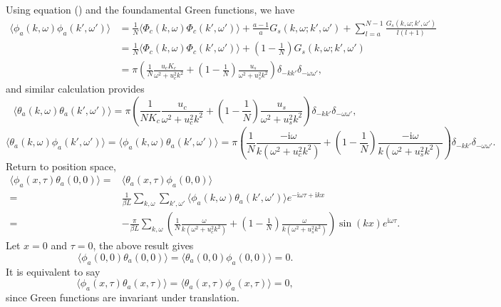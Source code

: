 \documentclass[10pt]{extarticle}
\newcommand{\dd}{\mathrm{d}}
\newcommand{\ii}{\mathrm{i}}
\begin{document}
Using equation (\theequation) and the foundamental Green functions, we have
\begin{align*}
	\langle \phi_a(k,\omega)\phi_a(k',\omega')\rangle &=\frac{1}{N}\langle \Phi_c(k,\omega)\Phi_c(k',\omega')\rangle +\frac{a-1}{a}G_s(k,\omega;k',\omega')+\sum_{l=a}^{N-1}\frac{G_s(k,\omega;k',\omega')}{l(l+1)}\\
	&=\frac{1}{N}\langle \Phi_c(k,\omega)\Phi_c(k',\omega')\rangle+\left(1-\frac{1}{N}\right)G_s(k,\omega;k',\omega')\\
	&=\pi\left(\frac{1}{N}\frac{u_c K_c}{\omega^2+u_c^2k^2}+\left(1-\frac{1}{N}\right)\frac{u_s}{\omega^2+u_s^2k^2}\right)\delta_{-kk'}\delta_{-\omega\omega'},
\end{align*}
and similar calculation provides
\[
	\langle \theta_a(k,\omega)\theta_a(k',\omega')\rangle =\pi\left(\frac{1}{N K_c}\frac{u_c}{\omega^2+u_c^2k^2}+\left(1-\frac{1}{N}\right)\frac{u_s}{\omega^2+u_s^2k^2}\right)\delta_{-kk'}\delta_{-\omega\omega'},
\]
\[
	\langle \theta_a(k,\omega)\phi_a(k',\omega')\rangle =\langle \phi_a(k,\omega)\theta_a(k',\omega')\rangle =\pi\left(\frac{1}{N}\frac{-\ii\omega}{k(\omega^2+u_c^2k^2)}+\left(1-\frac{1}{N}\right)\frac{-\ii\omega}{k(\omega^2+u_s^2k^2)}\right)\delta_{-kk'}\delta_{-\omega\omega'}.
\]
Return to position space, 
\begin{equation}
\begin{aligned}
	\langle \phi_a(x,\tau)\theta_a(0,0)\rangle=&\langle \theta_a(x,\tau)\phi_a(0,0)\rangle \\
	=&\frac{1}{\beta L}\sum_{k,\omega}\sum_{k',\omega'}\langle \phi_a(k,\omega)\theta_a(k',\omega')\rangle e^{-\ii \omega\tau+\ii k x}\\
	=&-\frac{\pi}{\beta L}\sum_{k,\omega}\left(\frac{1}{N}\frac{\omega}{k(\omega^2+u_c^2k^2)}+\left(1-\frac{1}{N}\right)\frac{\omega}{k(\omega^2+u_s^2k^2)}\right)\sin(kx)e^{\ii\omega\tau}.
\end{aligned}
\end{equation}
Let $x=0$ and $\tau=0$, the above result gives
\[
	\langle \phi_a(0,0)\theta_a(0,0)\rangle=\langle \theta_a(0,0)\phi_a(0,0)\rangle=0.
\]
It is equivalent to say
\[
	\langle \phi_a(x,\tau)\theta_a(x,\tau)\rangle=\langle \theta_a(x,\tau)\phi_a(x,\tau)\rangle=0,
\]
since Green functions are invariant under translation.
\end{document}
